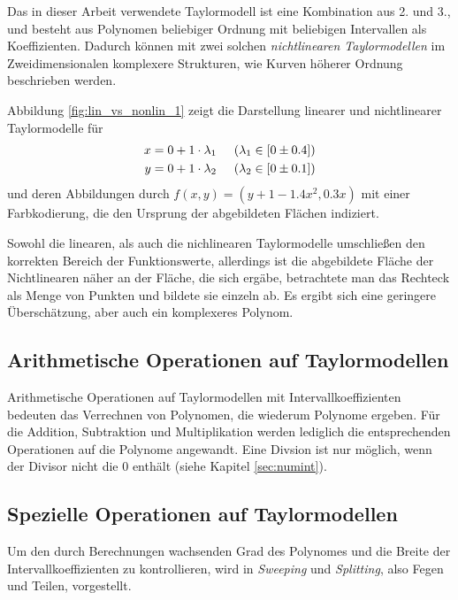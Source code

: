 Das in dieser Arbeit verwendete Taylormodell ist eine Kombination aus 2. und 3., und besteht aus Polynomen beliebiger Ordnung mit beliebigen Intervallen als Koeffizienten. Dadurch können mit zwei solchen \textit{nichtlinearen Taylormodellen} im Zweidimensionalen komplexere Strukturen, wie Kurven höherer Ordnung beschrieben werden.

Abbildung \ref{fig:lin_vs_nonlin_1} zeigt die Darstellung linearer und nichtlinearer Taylormodelle für
\begin{align*}
x = 0 + 1 \cdot \lambda_1 & \hspace{0.5cm} (\lambda_1 \in [0 \pm 0.4]) \\
 y = 0 + 1 \cdot \lambda_2 & \hspace{0.5cm} (\lambda_2 \in [0 \pm 0.1])
\end{align*}
und deren Abbildungen durch $f(x,y) = (y + 1- 1.4 x^2,0.3x)$ mit einer Farbkodierung, die den Ursprung der abgebildeten Flächen indiziert.


Sowohl die linearen, als auch die nichlinearen Taylormodelle umschließen den korrekten Bereich der Funktionswerte, allerdings ist die abgebildete Fläche der Nichtlinearen näher an der Fläche, die sich ergäbe, betrachtete man das Rechteck als Menge von Punkten und bildete sie einzeln ab. Es ergibt sich eine geringere Überschätzung, aber auch ein komplexeres Polynom.


\subsection{Arithmetische Operationen auf Taylormodellen}

Arithmetische Operationen auf Taylormodellen mit Intervallkoeffizienten bedeuten das Verrechnen von Polynomen, die wiederum Polynome ergeben. Für die Addition, Subtraktion und Multiplikation werden lediglich die entsprechenden Operationen auf die Polynome angewandt. Eine Divsion ist nur möglich, wenn der Divisor nicht die 0 enthält (siehe Kapitel \ref{sec:numint}).




    \subsection{Spezielle Operationen auf Taylormodellen}
Um den durch Berechnungen wachsenden Grad des Polynomes und die Breite der Intervallkoeffizienten zu kontrollieren, wird in \cite{DBLP:conf/macis/BrausseKM15} \textit{Sweeping} und \textit{Splitting}, also Fegen und Teilen, vorgestellt. 

